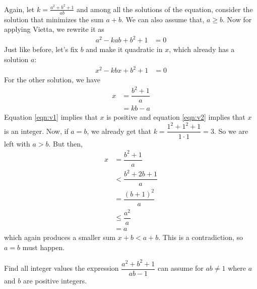 \documentclass{subfile}
\begin{document}
	\begin{solution}
		Again, let $k=\frac{a^2+b^2+1}{ab}$ and among all the solutions of the equation, consider the solution that minimizes the sum $a+b$. We can also assume that, $a\geq b$. Now for applying Vietta, we rewrite it as
			\begin{align*}
				a^2-kab+b^2+1 & = 0
			\end{align*}
		Just like before, let's fix $b$ and make it quadratic in $x$, which already has a solution $a$:
			\begin{align*}
				x^2-kbx+b^2+1 & = 0
			\end{align*}
		For the other solution, we have
			\begin{align}
				x & = \dfrac{b^2+1}{a}\label{eqn:v1}\\
				  & = kb-a\label{eqn:v2}
			\end{align}
		Equation \eqref{eqn:v1} implies that $x$ is positive and equation \eqref{eqn:v2} implies that $x$ is an integer. Now, if $a=b$, we already get that $k=\dfrac{1^2+1^2+1}{1\cdot1}=3$. So we are left with $a>b$. But then,
			\begin{align*}
				x
					& = \dfrac{b^2+1}{a}\\
					& < \dfrac{b^2+2b+1}{a}\\
					& = \dfrac{(b+1)^2}{a}\\
					& \leq\dfrac{a^2}{a}\\
					& = a
			\end{align*}
		which again produces a smaller sum $x+b<a+b$. This is a contradiction, so $a=b$ must happen.
	\end{solution}

	\begin{problem}
		Find all integer values the expression $\dfrac{a^2+b^2+1}{ab-1}$ can assume for $ab\neq1$ where $a$ and $b$ are positive integers.
	\end{problem}
\end{document}
